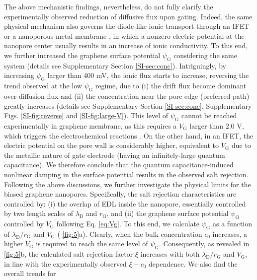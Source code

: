 The above mechanistic findings, nevertheless, do not fully clarify the
experimentally observed reduction of diffusive flux upon
gating. Indeed, the same physical mechanism also governs the {
  diode-like ionic transport through an IFET
  \cite{Nam_2009,Lee_2015,Feng_2016} or a nanoporous metal membrane
  \cite{mccurry2017electrolyte}}, in which a nonzero electric
potential at the nanopore center usually results in an increase of
ionic conductivity. To this end, we further increased the graphene
surface potential $\psi_{\mathrm{G}}$ considering the same system
(details see Supplementary Section \ref{SI-sec:conc}). Intriguingly,
by increasing $\psi_{\mathrm{G}}$ larger than 400 mV, the ionic flux
starts to increase, reversing the trend observed at the low
$\psi_{\mathrm{G}}$ regime, due to (i) the drift flux become dominant
over diffusion flux and (ii) the concentration near the pore edge
(preferred path) greatly increases (details see Supplementary Section
\ref{SI-sec:conc}, Supplementary Figs. \ref{SI-fig:reverse} and
\ref{SI-fig:large-V}). This level of $\psi_{\mathrm{G}}$ cannot be
reached experimentally in graphene membrane, as this requires a
$V_{\mathrm{G}}$ larger than 2.0 V, which triggers the electrochemical
reactions \cite{Toh_2011}. On the other hand, in an IFET, the electric
potential on the pore wall is considerably higher, equivalent to
$V_{\mathrm{G}}$ due to the metallic nature of gate electrode (having
an infinitely-large quantum capacitance). We therefore conclude that
the quantum capacitance-induced nonlinear damping in the surface
potential results in the observed salt rejection.  Following the above
discussions, we further investigate the physical limits for the biased
graphene nanopores. Specifically, the salt rejection characteristics
are controlled by: (i) the overlap of EDL inside the nanopore,
essentially controlled by two length scales of $\lambda_{\mathrm{D}}$
and $r_{\mathrm{G}}$, and (ii) the graphene surface potential
$\psi_{\mathrm{G}}$ controlled by $V_{\mathrm{G}}$ following
Eq. \eqref{eq:Vg}. To this end, we calculate $\psi_{\mathrm{G}}$ as a
function of $\lambda_{\mathrm{D}} / r_{\mathrm{G}}$ and
$V_{\mathrm{G}}$ (\Fig{} \ref{fig:5}a). Clearly, when the bulk
concentration $c_{0}$ increases, a higher $V_{\mathrm{G}}$ is required
to reach the same level of $\psi_{\mathrm{G}}$. Consequently, as
revealed in \Fig{} \ref{fig:5}b, the calculated salt rejection factor
$\xi$ increases with both $\lambda_{\mathrm{D}} / r_{\mathrm{G}}$ and
$V_{\mathrm{G}}$, in line with the experimentally observed
$\xi - c_{0}$ dependence. We also find the overall trends for
